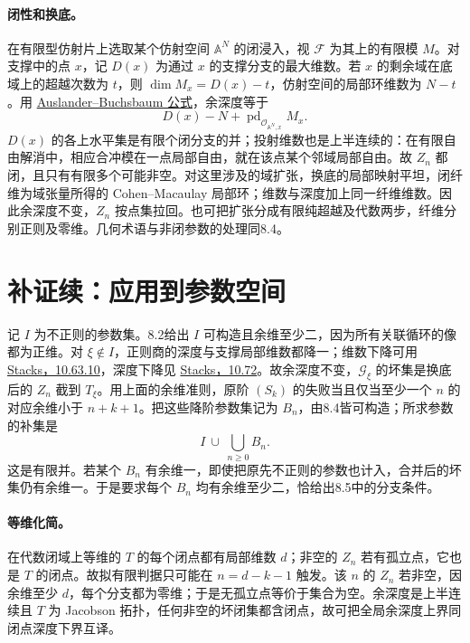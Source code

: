 \documentclass[openany,fontset=fandol]{ctexbook}
\newcommand{\F}{\mathcal F}
\newcommand{\G}{\mathcal G}
\begin{document}
\paragraph{闭性和换底。}
在有限型仿射片上选取某个仿射空间 $\mathbb A^N$ 的闭浸入，视 $\F$ 为其上的有限模 $M$。对支撑中的点 $x$，记 $D(x)$ 为通过 $x$ 的支撑分支的最大维数。若 $x$ 的剩余域在底域上的超越次数为 $t$，则 $\dim M_x=D(x)-t$，仿射空间的局部环维数为 $N-t$。用 \href{https://stacks.math.columbia.edu/tag/00O7}{Auslander--Buchsbaum 公式}，余深度等于
\[
 D(x)-N+\operatorname{pd}_{\mathcal O_{\mathbb A^N,x}}M_x .
\]
$D(x)$ 的各上水平集是有限个闭分支的并；投射维数也是上半连续的：在有限自由解消中，相应合冲模在一点局部自由，就在该点某个邻域局部自由。故 $Z_n$ 都闭，且只有有限多个可能非空。对这里涉及的域扩张，换底的局部映射平坦，闭纤维为域张量所得的 Cohen--Macaulay 局部环；维数与深度加上同一纤维维数。因此余深度不变，$Z_n$ 按点集拉回。也可把扩张分成有限纯超越及代数两步，纤维分别正则及零维。几何术语与非闭参数的处理同8.4。

\newpage
\section*{补证续：应用到参数空间}
记 $I$ 为不正则的参数集。8.2给出 $I$ 可构造且余维至少二，因为所有关联循环的像都为正维。对 $\xi\notin I$，正则商的深度与支撑局部维数都降一；维数下降可用 \href{https://stacks.math.columbia.edu/tag/0B52}{Stacks，10.63.10}，深度下降见 \href{https://stacks.math.columbia.edu/tag/00LE}{Stacks，10.72}。故余深度不变，$\G_\xi$ 的坏集是换底后的 $Z_n$ 截到 $T_\xi$。用上面的余维准则，原阶 $(S_k)$ 的失败当且仅当至少一个 $n$ 的对应余维小于 $n+k+1$。把这些降阶参数集记为 $B_n$，由8.4皆可构造；所求参数的补集是
\[
 I\ \cup\ \bigcup_{n\ge0} B_n.
\]
这是有限并。若某个 $B_n$ 有余维一，即使把原先不正则的参数也计入，合并后的坏集仍有余维一。于是要求每个 $B_n$ 均有余维至少二，恰给出8.5中的分支条件。

\paragraph{等维化简。}
在代数闭域上等维的 $T$ 的每个闭点都有局部维数 $d$；非空的 $Z_n$ 若有孤立点，它也是 $T$ 的闭点。故拟有限判据只可能在 $n=d-k-1$ 触发。该 $n$ 的 $Z_n$ 若非空，因余维至少 $d$，每个分支都为零维；于是无孤立点等价于集合为空。余深度是上半连续且 $T$ 为 Jacobson 拓扑，任何非空的坏闭集都含闭点，故可把全局余深度上界同闭点深度下界互译。
\end{document}
